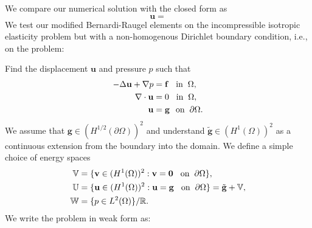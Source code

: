 We compare our numerical solution with the closed form as
\begin{equation}\label{eq:closedteststokes}
		  \mathbf{u} = 
\end{equation}
\fi
We test our modified Bernardi-Raugel elements on the 
incompressible isotropic elasticity problem but with a non-homogenous Dirichlet boundary condition,
i.e., on the problem:

Find the displacement $\mathbf{u}$ and pressure $p$ such that
\begin{equation}\label{eq:testbr}
		  \begin{aligned}
					 -\Delta \mathbf{u} + \nabla p &= \mathbf{f} \hspace{0.3cm} \text{in} \hspace{0.2cm} \Omega, \\
					 \nabla \cdot \mathbf{u}  &= 0 \hspace{0.3cm} \text{in} \hspace{0.2cm} \Omega,\\
					 \mathbf{u} &= \mathbf{g} \hspace{0.25cm} \text{on} \hspace{0.2cm} \partial \Omega.
		  \end{aligned}
\end{equation}
We assume that $\mathbf{g} \in (H^{1/2}(\partial\Omega))^2$ and understand $\tilde{\mathbf{g}} \in (H^1(\Omega))^2$
as a continuous extension from the boundary into the domain.
We define a simple choice of energy spaces
\begin{equation}
		  \begin{aligned}
					 \mathbb{V} &= \{\mathbf{v} \in (H^1(\Omega))^2 : \mathbf{v} = \mathbf{0} \hspace{0.3cm} \text{on} \hspace{0.2cm} \partial \Omega\}, \\
					 \mathbb{U} &= \{\mathbf{u} \in (H^1(\Omega))^2 : \mathbf{u} = \mathbf{g} 
					 \hspace{0.3cm} \text{on} \hspace{0.2cm} \partial \Omega\} = \tilde{\mathbf{g}} +\mathbb{V}, \\
					 \mathbb{W} &= \{p \in L^2(\Omega)\}/\mathbb{R}.
		  \end{aligned}
\end{equation}
We write the problem in weak form as:

